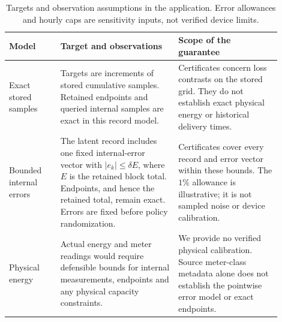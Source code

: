 \documentclass[12pt]{article}
\begin{document}
\begin{table}[htbp]
\centering\small
\caption{Targets and observation assumptions in the application. Error
allowances and hourly caps are sensitivity inputs, not verified device limits.}
\label{tab:measurement-assumptions}
\begin{tabular}{>{\raggedright\arraybackslash}p{0.17\linewidth}>{\raggedright\arraybackslash}p{0.39\linewidth}>{\raggedright\arraybackslash}p{0.34\linewidth}}
\toprule
Model & Target and observations & Scope of the guarantee\\
\midrule
Exact stored samples
& Targets are increments of stored cumulative samples. Retained endpoints
and queried internal samples are exact in this record model.
& Certificates concern loss contrasts on the stored grid. They do not
establish exact physical energy or historical delivery times.\\
Bounded internal errors
& The latent record includes one fixed internal-error vector with
$|e_k|\leq\delta E$, where $E$ is the retained block total. Endpoints, and hence the
retained total, remain exact. Errors are fixed before policy randomization.
& Certificates cover every record and error vector within these bounds.
The $1\%$ allowance is illustrative; it is not sampled noise or device calibration.\\
Physical energy
& Actual energy and meter readings would require defensible bounds for
internal measurements, endpoints and any physical capacity constraints.
& We provide no verified physical calibration. Source meter-class metadata
alone does not establish the pointwise error model or exact endpoints.\\
\bottomrule
\end{tabular}
\end{table}
\end{document}
